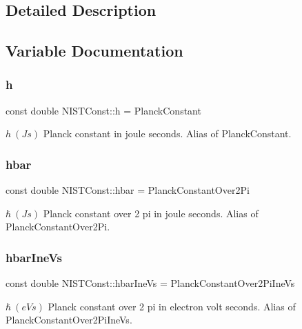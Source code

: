 \subsection{Detailed Description}


\subsection{Variable Documentation}
\mbox{\label{group___n_i_s_t_const-_planck_constant_ga772638524d12d0e8a63abb25441f87a9}} 
\subsubsection{\texorpdfstring{h}{h}}
{\footnotesize\ttfamily const double N\+I\+S\+T\+Const\+::h = Planck\+Constant}

$h \ (J s)$ Planck constant in joule seconds. Alias of Planck\+Constant. \mbox{\label{group___n_i_s_t_const-_planck_constant_gaec21867afdeb1950b150e667513cd842}} 
\subsubsection{\texorpdfstring{hbar}{hbar}}
{\footnotesize\ttfamily const double N\+I\+S\+T\+Const\+::hbar = Planck\+Constant\+Over2\+Pi}

$\hbar \ (J s)$ Planck constant over 2 pi in joule seconds. Alias of Planck\+Constant\+Over2\+Pi. \mbox{\label{group___n_i_s_t_const-_planck_constant_gacbb39d7d0090ed14cb725a1d6eaa3fd3}} 
\subsubsection{\texorpdfstring{hbar\+Ine\+Vs}{hbarIneVs}}
{\footnotesize\ttfamily const double N\+I\+S\+T\+Const\+::hbar\+Ine\+Vs = Planck\+Constant\+Over2\+Pi\+Ine\+Vs}

$\hbar \ (eV s)$ Planck constant over 2 pi in electron volt seconds. Alias of Planck\+Constant\+Over2\+Pi\+Ine\+Vs. \mbox{\label{group___n_i_s_t_const-_planck_constant_ga58501029ba9f6b757d6d9992dfb56b4f}} 
